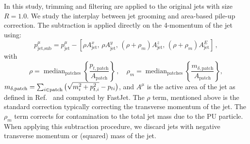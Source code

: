 In this study, trimming and filtering are applied to the original \antikt{} jets with size $R = 1.0$. 
%
%
We study the interplay between jet grooming and area-based pile-up 
correction. The subtraction is applied directly on the 4-momentum 
of the jet using:
\begin{equation}\label{eq:pusub}
  p^\mu_\text{jet,sub} = p^\mu_\text{jet}  
  - [\rho A^x_\text{jet}, \,\rho A^y_\text{jet}, \,
  (\rho+\rho_m) A^z_\text{jet}, \,(\rho+\rho_m) A^E_\text{jet}]\,,
\end{equation}
with
\begin{equation}
  \rho = \mathop{\text{median}}_\text{patches}
  \left\{\frac{p_{t,\text{patch}}}{A_\text{patch}}\right\}
  \,,\quad
  \rho_m = \mathop{\text{median}}_\text{patches}
  \left\{\frac{m_{\delta,\text{patch}}}{A_\text{patch}}\right\},
\end{equation}
$m_{\delta,\text{patch}} = \sum_{i\in\text{patch}}
\big(\sqrt{\smash[b]{m^2_{i} + p_{t,i}^2}} - p_{ti}\big)$, and $A^\mu$
is the active area of the jet as defined in
Ref.~\cite{Cacciari:2008gn} and computed by FastJet. The $\rho$ term,
mentioned above is the standard correction typically correcting the
transverse momentum of the jet. The $\rho_m$ term corrects for
contamination to the total jet mass due to the PU particle. 
When applying this subtraction procedure, we
discard jets with negative transverse momentum or (squared) mass of the jet.
%

